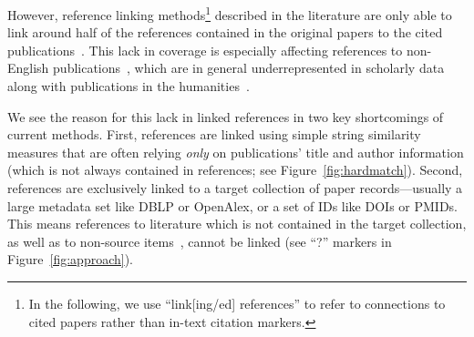 However, reference linking methods\footnote{In the following, we use ``link[ing/ed] references'' to refer to connections to cited papers rather than in-text citation markers.} described in the literature are only able to link around half of the references contained in the original papers to the cited publications~\cite{Lo2020,Saier2020}. This lack in coverage is especially affecting references to non-English publications~\cite{Saier2021}, which are in general underrepresented in scholarly data~\cite{Vera-Baceta2019,Liu2019,Moed2018,Moskaleva2019} along with publications in the humanities~\cite{Colavizza2019,Kellsey2004}.

We see the reason for this lack in linked references in two key shortcomings of current methods.
First, references are linked using simple string similarity measures that are often relying \emph{only} on publications' title and author information (which is not always contained in references; see Figure~\ref{fig:hardmatch}). %
Second, references are exclusively linked to a target collection of paper records---usually a large metadata set like DBLP or OpenAlex, or a set of IDs like DOIs or PMIDs. This means references to literature which is not contained in the target collection, as well as to non-source items~\cite{Chi2014}, cannot be linked (see ``?'' markers in Figure~\ref{fig:approach}).


